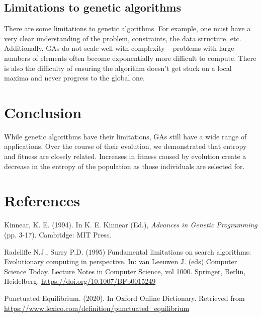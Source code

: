 \documentclass[11pt]{article}
\begin{document}
\subsection{Limitations to genetic algorithms}
\label{sec:org148bf83}

There are some limitations to genetic algorithms. For example, one
must have a very clear understanding of the problem, constraints, the
data structure, etc. Additionally, GAs do not scale
well with complexity -- problems with large numbers of elements often
become exponentially more difficult to compute. There is also the
difficulty of ensuring the algorithm doesn't get stuck on a local
maxima and never progress to the global one.

\section{Conclusion}
While genetic algorithms have their limitations, GAs still have a wide range 
of applications. Over the course of their evolution, we demonstrated 
that entropy and fitness are closely related. Increases in fitness 
caused by evolution create a decrease in the entropy of the population 
as those individuals are selected for.

\pagebreak
\section{References}
\label{sec:org9dc046e}
\doublespacing

Kinnear, K. E. (1994). In K. E. Kinnear (Ed.), \emph{Advances in
Genetic Programming} (pp. 3-17). Cambridge: MIT Press.

Radcliffe N.J., Surry P.D. (1995) Fundamental limitations on search
algorithms: Evolutionary computing in perspective.  In: van Leeuwen
J. (eds) Computer Science Today. Lecture Notes in Computer Science,
vol 1000. Springer, Berlin, Heidelberg.
\url{https://doi.org/10.1007/BFb0015249}

Punctuated Equilibrium. (2020). In Oxford Online Dictionary. Retrieved
from \url{https://www.lexico.com/definition/punctuated_equilibrium}
\end{document}
